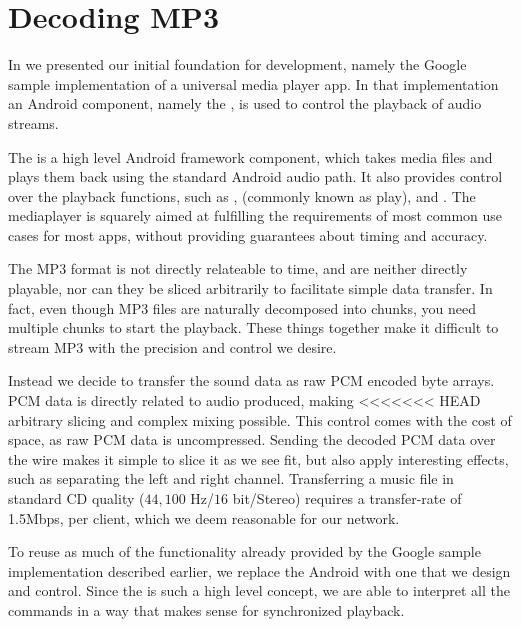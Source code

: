 \section{Decoding MP3}

In  we presented our initial
foundation for development, namely the Google sample implementation of
a universal media player app. In that implementation an Android
component, namely the , is used to
control the playback of audio streams.

The  is a high level Android framework component,
which takes media files and plays them back using the standard Android
audio path. It also provides control over the playback functions, such
as ,  (commonly known as play), and
. The mediaplayer is squarely aimed at fulfilling the
requirements of most common use cases for most apps, without providing
guarantees about timing and accuracy.

The MP3 format is not directly relateable to time, and are
neither directly playable, nor can they be sliced arbitrarily to
facilitate simple data transfer. In fact, even though MP3 files are
naturally decomposed into chunks, you need multiple chunks to start the
playback. These things together make it difficult to stream MP3 with the
precision and control we desire.

Instead we decide to transfer the sound data as raw \ac{PCM} encoded
byte arrays. \ac{PCM} data is directly related to audio produced, making
<<<<<<< HEAD
arbitrary slicing and complex mixing possible. This control comes with the cost of space,
as raw \ac{PCM} data is uncompressed. Sending the decoded
\ac{PCM} data over the wire makes it simple to slice it as we see fit,
but also apply interesting effects, such as separating the left and
right channel.
Transferring a music file in standard CD quality
($44,100$ Hz/$16$ bit/Stereo) requires a transfer-rate of 1.5Mbps, per
client, which we deem reasonable for our network.

To reuse as much of the functionality already provided by the Google sample implementation described earlier, we
replace the Android  with one that we design and
control. Since the  is such a high level concept, we
are able to interpret all the commands in a way that makes sense for
synchronized playback.

